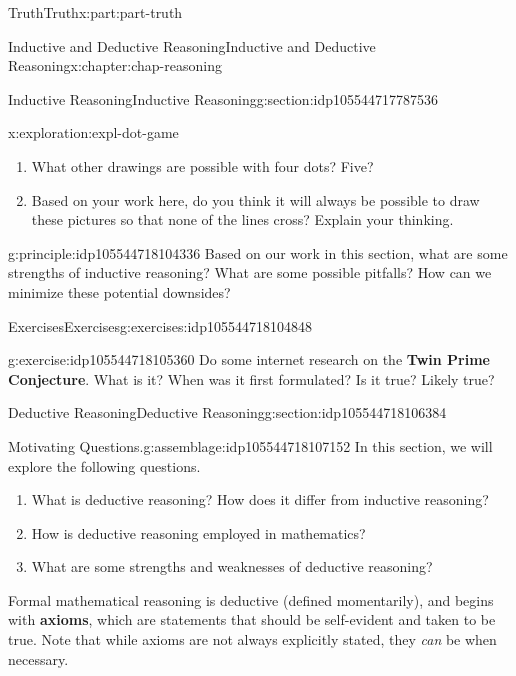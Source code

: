 \documentclass[oneside,10pt,]{book}
\newcommand{\terminology}[1]{\textbf{#1}}
\numberwithin{equation}{section}
\begin{document}
\begin{partptx}{Truth}{}{Truth}{}{}{x:part:part-truth}
\begin{chapterptx}{Inductive and Deductive Reasoning}{}{Inductive and Deductive Reasoning}{}{}{x:chapter:chap-reasoning}
\begin{sectionptx}{Inductive Reasoning}{}{Inductive Reasoning}{}{}{g:section:idp105544717787536}
\begin{exploration}{}{x:exploration:expl-dot-game}
\begin{enumerate}
\item{}What other drawings are possible with four dots? Five?%
\item{}Based on your work here, do you think it will always be possible to draw these pictures so that none of the lines cross? Explain your thinking.%
\end{enumerate}
\end{exploration}%
\begin{principle}{}{}{g:principle:idp105544718104336}%
Based on our work in this section, what are some strengths of inductive reasoning? What are some possible pitfalls? How can we minimize these potential downsides?%
\end{principle}
%
%
\typeout{************************************************}
\typeout{************************************************}
%
\begin{exercises-subsection-numberless}{Exercises}{}{Exercises}{}{}{g:exercises:idp105544718104848}
\begin{divisionexercise}{1}{}{}{g:exercise:idp105544718105360}%
Do some internet research on the \terminology{Twin Prime Conjecture}. What is it? When was it first formulated? Is it true? Likely true?%
\end{divisionexercise}%
\end{exercises-subsection-numberless}
\end{sectionptx}
%
%
\typeout{************************************************}
\typeout{************************************************}
%
\begin{sectionptx}{Deductive Reasoning}{}{Deductive Reasoning}{}{}{g:section:idp105544718106384}
\begin{assemblage}{Motivating Questions.}{g:assemblage:idp105544718107152}%
In this section, we will explore the following questions. %
\begin{enumerate}
\item{}What is deductive reasoning? How does it differ from inductive reasoning?%
\item{}How is deductive reasoning employed in mathematics?%
\item{}What are some strengths and weaknesses of deductive reasoning?%
\end{enumerate}
%
\end{assemblage}
Formal mathematical reasoning is deductive (defined momentarily), and begins with \terminology{axioms}, which are statements that should be self-evident and taken to be true. Note that while axioms are not always explicitly stated, they \emph{can} be when necessary.%

\end{sectionptx}
\end{chapterptx}
\end{partptx}
\end{document}
